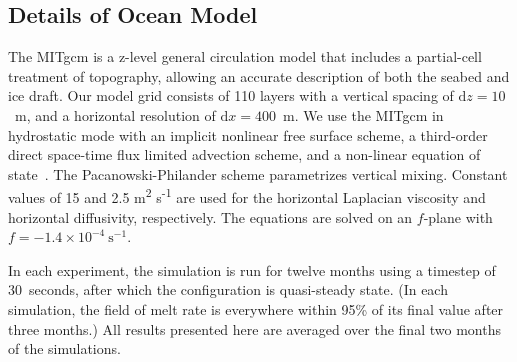 \documentclass[draft]{agujournal2019}
\begin{document}
\subsection{Details of Ocean Model}\label{S:Experiment:Model}
The MITgcm is a z-level general circulation model that includes a partial-cell treatment of topography, allowing an accurate description of both the seabed and ice draft. Our model grid consists of 110 layers with a vertical spacing of $\mathrm{d}z = 10$~m, and a horizontal resolution of  $\mathrm{d}x=400$~m. We use the MITgcm in hydrostatic mode with an implicit nonlinear free surface scheme, a third-order direct space-time flux limited advection scheme, and a non-linear equation of state~\cite{Mcdougall2003JAtmosOceanTech}. The Pacanowski-Philander \cite{Pacanowski1981JPhysOcean} scheme parametrizes vertical mixing. Constant values of 15 and 2.5
m\textsuperscript{2} s\textsuperscript{-1} are used for the horizontal Laplacian viscosity and horizontal diffusivity, respectively. The equations are solved on an $f$-plane with $f = -1.4\times10^{-4}~\text{s}^{-1}$.

In each experiment, the simulation is run for twelve months using a timestep of 30~\si{seconds}, after which the configuration is quasi-steady state. (In each simulation, the field of melt rate is everywhere within 95\% of its final value after three months.) All results presented here are averaged over the final two months of the simulations.
\end{document}
